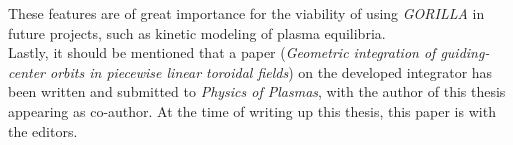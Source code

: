 \documentclass[./main.tex]{subfiles}
\begin{document}
These features are of great importance for the viability of using \textit{GORILLA} in future projects, such as kinetic modeling of plasma equilibria.\\
Lastly, it should be mentioned that a paper (\textit{Geometric integration of guiding-center orbits in piecewise linear toroidal fields}) on the developed integrator has been written and submitted to \textit{Physics of Plasmas}, with the author of this thesis appearing as co-author. At the time of writing up this thesis, this paper is with the editors.

\newpage
\end{document}
